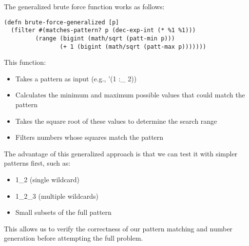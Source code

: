 \documentclass{article}
\begin{document}
The generalized brute force function works as follows:

\begin{verbatim}
(defn brute-force-generalized [p]
  (filter #(matches-pattern? p (dec-exp-int (* %1 %1))) 
         (range (bigint (math/sqrt (patt-min p))) 
                (+ 1 (bigint (math/sqrt (patt-max p)))))))
\end{verbatim}

This function:
\begin{itemize}
\item Takes a pattern as input (e.g., '(1 :_ 2))
\item Calculates the minimum and maximum possible values that could match the pattern
\item Takes the square root of these values to determine the search range
\item Filters numbers whose squares match the pattern
\end{itemize}

The advantage of this generalized approach is that we can test it with simpler patterns first, such as:
\begin{itemize}
\item 1\_2 (single wildcard)
\item 1\_2\_3 (multiple wildcards)
\item Small subsets of the full pattern
\end{itemize}

This allows us to verify the correctness of our pattern matching and number generation before attempting the full problem.
\end{document}

